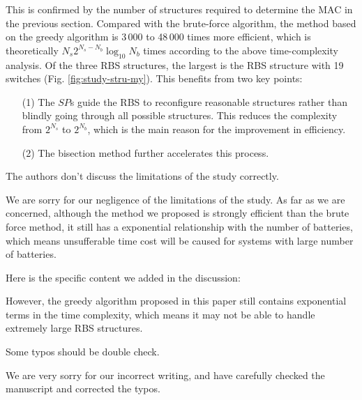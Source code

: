 \begin{revresponse}
\begin{changes}
This is confirmed by the number of structures required to determine the MAC in the previous section. 
Compared with the brute-force algorithm, the method based on the greedy algorithm is 3\,000 to 48\,000 times more efficient, which is theoretically $N_s 2^{N_s - N_b} \log_{10} N_b$ times according to the above time-complexity analysis.
Of the three RBS structures, the largest is the RBS structure with 19 switches (Fig. \ref{fig:study-stru-my}).
This benefits from two key points:
\begin{enumerate}
\item[(1)] The $SP$s guide the RBS to reconfigure reasonable structures rather than blindly going through all possible structures. This reduces the complexity from $2^{N_s}$ to $2^{N_b}$, which is the main reason for the improvement in efficiency.
\item[(2)] The bisection method further accelerates this process.
\end{enumerate}
\end{changes}

\end{revresponse}

\begin{revcomment}
  The authors don't discuss the limitations of the study correctly.
\end{revcomment}
\begin{revresponse}

We are sorry for our negligence of the limitations of the study. As far as we are concerned, although the method we proposed is strongly efficient than the brute force method, it still has a exponential relationship with the number of batteries, which means unsufferable time cost will be caused for systems with large number of batteries.


Here is the specific content we added in the discussion:
\begin{changes}
However, the greedy algorithm proposed in this paper still contains exponential terms in the time complexity, which means it may not be able to handle extremely large RBS structures. 
\end{changes}

\end{revresponse}


\begin{revcomment}
  Some typos should be double check.
\end{revcomment}
\begin{revresponse}

We are very sorry for our incorrect writing, and have carefully checked the manuscript and corrected the typos. 
  
\end{revresponse}

